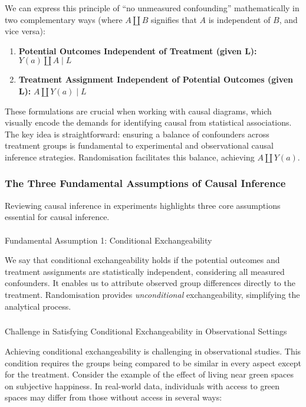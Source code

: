 \documentclass[
  singlecolumn]{article}
\makeatletter
\let\oldparagraph\paragraph
\renewcommand{\paragraph}{
    \@ifstar
      \xxxParagraphStar
      \xxxParagraphNoStar
  }
\newcommand{\xxxParagraphStar}[1]{\oldparagraph*{#1}\mbox{}}
\newcommand{\xxxParagraphNoStar}[1]{\oldparagraph{#1}\mbox{}}
\let\oldsubparagraph\subparagraph
\renewcommand{\subparagraph}{
    \@ifstar
      \xxxSubParagraphStar
      \xxxSubParagraphNoStar
  }
\newcommand{\xxxSubParagraphStar}[1]{\oldsubparagraph*{#1}\mbox{}}
\newcommand{\xxxSubParagraphNoStar}[1]{\oldsubparagraph{#1}\mbox{}}
\providecommand{\tightlist}{%
  \setlength{\itemsep}{0pt}\setlength{\parskip}{0pt}}\usepackage{longtable,booktabs,array}
\makeatother
\begin{document}
We can express this principle of ``no unmeasured confounding''
mathematically in two complementary ways (where \(A \coprod B\)
signifies that \(A\) is independent of \(B\), and vice versa):

\begin{enumerate}
\def\labelenumi{\arabic{enumi}.}
\tightlist
\item
  \textbf{Potential Outcomes Independent of Treatment (given L):}
  \(Y(a) \coprod A \mid L\)
\item
  \textbf{Treatment Assignment Independent of Potential Outcomes (given
  L):} \(A \coprod Y(a) \mid L\)
\end{enumerate}

These formulations are crucial when working with causal diagrams, which
visually encode the demands for identifying causal from statistical
associations. The key idea is straightforward: ensuring a balance of
confounders across treatment groups is fundamental to experimental and
observational causal inference strategies. Randomisation facilitates
this balance, achieving \(A \coprod Y(a)\).

\subsubsection{The Three Fundamental Assumptions of Causal
Inference}\label{sec-three-fundamental-assumptions}

Reviewing causal inference in experiments highlights three core
assumptions essential for causal inference.

\paragraph{Fundamental Assumption 1: Conditional
Exchangeability}\label{fundamental-assumption-1-conditional-exchangeability}

We say that conditional exchangeability holds if the potential outcomes
and treatment assignments are statistically independent, considering all
measured confounders. It enables us to attribute observed group
differences directly to the treatment. Randomisation provides
\emph{unconditional} exchangeability, simplifying the analytical
process.

\subparagraph{Challenge in Satisfying Conditional Exchangeability in
Observational
Settings}\label{challenge-in-satisfying-conditional-exchangeability-in-observational-settings}

Achieving conditional exchangeability is challenging in observational
studies. This condition requires the groups being compared to be similar
in every aspect except for the treatment. Consider the example of the
effect of living near green spaces on subjective happiness. In
real-world data, individuals with access to green spaces may differ from
those without access in several ways:
\end{document}
